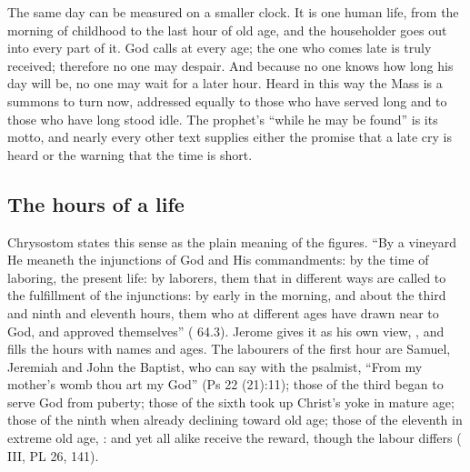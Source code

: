 \label{sec:seek-the-lord}

The same day can be measured on a smaller clock. It is one human life, from
the morning of childhood to the last hour of old age, and the householder goes
out into every part of it. God calls at every age; the one who comes late is
truly received; therefore no one may despair. And because no one knows how
long his day will be, no one may wait for a later hour. Heard in this way the
Mass is a summons to turn now, addressed equally to those who have served long
and to those who have long stood idle. The prophet's ``while he may be found''
is its motto, and nearly every other text supplies either the promise that a
late cry is heard or the warning that the time is short.

\subsection{The hours of a life}

Chrysostom states this sense as the plain meaning of the figures. ``By a
vineyard He meaneth the injunctions of God and His commandments: by the time
of laboring, the present life: by laborers, them that in different ways are
called to the fulfillment of the injunctions: by early in the morning, and
about the third and ninth and eleventh hours, them who at different ages have
drawn near to God, and approved themselves'' (
64.3). Jerome gives it as his own view, , and fills the
hours with names and ages. The labourers of the first hour are Samuel,
Jeremiah and John the Baptist, who can say with the psalmist, ``From my
mother's womb thou art my God'' (Ps 22 (21):11); those of the third began to serve God from
puberty; those of the sixth took up Christ's yoke in mature age; those of the
ninth when already declining toward old age; those of the eleventh in extreme
old age, : and yet all alike receive the reward, though the labour differs
( III, PL 26, 141).

